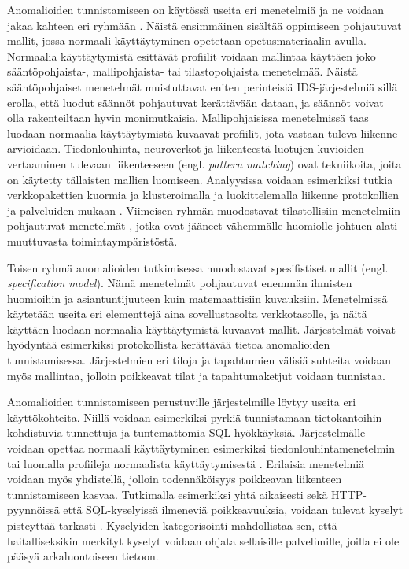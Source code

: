 Anomalioiden tunnistamiseen on käytössä useita eri menetelmiä ja ne voidaan jakaa kahteen eri ryhmään \cite{State}. Näistä ensimmäinen sisältää oppimiseen pohjautuvat mallit, jossa normaali 
käyttäytyminen opetetaan opetusmateriaalin avulla. Normaalia käyttäytymistä esittävät profiilit voidaan mallintaa käyttäen joko sään\-tö\-poh\-jais\-ta-, mallipohjaista- tai tilastopohjaista menetelmää. Näistä
sääntöpohjaiset menetelmät muistuttavat eniten perinteisiä IDS-järjestelmiä sillä erolla, että luodut säännöt pohjautuvat kerättävään dataan, ja säännöt voivat olla rakenteiltaan hyvin monimutkaisia. 
Mallipohjaisissa menetelmissä taas luodaan normaalia käyttäytymistä kuvaavat profiilit, jota vastaan tuleva liikenne arvioidaan. Tiedonlouhinta, neuroverkot ja liikenteestä luotujen kuvioiden vertaaminen
tulevaan liikenteeseen (engl. \textit{pattern matching}) ovat tekniikoita, joita on käytetty tällaisten mallien luomiseen. Analyysissa voidaan esimerkiksi tutkia verkkopakettien kuormia \cite{Payload}\cite{ULISSE} 
ja klusteroimalla ja luokittelemalla liikenne protokollien ja palveluiden mukaan \cite{Cluster}. Viimeisen ryhmän muodostavat tilastollisiin menetelmiin pohjautuvat menetelmät \cite{PacketHeader}, jotka
ovat jääneet vähemmälle huomiolle johtuen alati muuttuvasta toimintaympäristöstä.

Toisen ryhmä anomalioiden tutkimisessa muodostavat spesifistiset mallit (engl. \textit{specification model}). Nämä menetelmät pohjautuvat enemmän ihmisten huomioihin ja asiantuntijuuteen kuin matemaattisiin
kuvauksiin. Menetelmissä käytetään useita eri elementtejä aina sovellustasolta verkkotasolle, ja näitä käyttäen luodaan normaalia käyttäytymistä kuvaavat mallit. Järjestelmät voivat hyödyntää esimerkiksi
protokollista kerättävää tietoa anomalioiden tunnistamisessa. Järjestelmien eri tiloja ja tapahtumien välisiä suhteita voidaan myös mallintaa, jolloin poikkeavat tilat ja tapahtumaketjut voidaan
tunnistaa. 

Anomalioiden tunnistamiseen perustuville järjestelmille löytyy useita eri käyttökohteita. Niillä voidaan esimerkiksi pyrkiä tunnistamaan tietokantoihin kohdistuvia tunnettuja ja tuntemattomia SQL-hyökkäyksiä.
Järjestelmälle voidaan opettaa normaali käyttäytyminen esimerkiksi tiedonlouhintamenetelmin \cite{Data} tai luomalla profiileja normaalista käyttäytymisestä \cite{SQLanomaly}\cite{SQLlearning}. Erilaisia
menetelmiä voidaan myös yhdistellä, jolloin todennäköisyys poikkeavan liikenteen tunnistamiseen kasvaa. Tutkimalla esimerkiksi yhtä aikaisesti sekä HTTP-pyynnöissä että SQL-\-kyselyissä ilmeneviä poikkeavuuksia, 
voidaan tulevat kyselyt pisteyttää tarkasti \cite{WebSQL}. Kyselyiden kategorisointi mahdollistaa sen, että haitalliseksikin merkityt kyselyt voidaan ohjata sellaisille palvelimille, joilla ei ole 
pääsyä arkaluontoiseen tietoon. 

